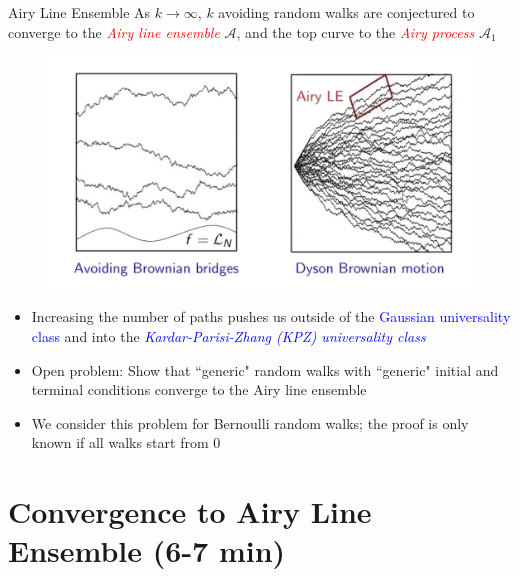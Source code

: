 \documentclass[9pt,t,dvipsnames]{beamer}
\begin{document}
\begin{frame}{Airy Line Ensemble}
As $k \to \infty$, $k$ avoiding random walks are conjectured to converge to the \textit{\textcolor{red}{Airy line ensemble}} $\mathcal{A}$, and the top curve to the \textit{\textcolor{red}{Airy process}} $\mathcal{A}_1$
\begin{figure}
	\includegraphics[height=0.45\textheight]{graphics/airy.png}
\end{figure}

\begin{itemize}
	
	\item Increasing the number of paths pushes us outside of the \textcolor{blue}{Gaussian universality class} and into the \textcolor{blue}{\textit{Kardar-Parisi-Zhang (KPZ) universality class}}
	
	\item Open problem: Show that ``generic" random walks with ``generic" initial and terminal conditions converge to the Airy line ensemble
	
	\item We consider this problem for Bernoulli random walks; the proof is only known if all walks start from 0
	
\end{itemize}
\end{frame}


\section{Convergence to Airy Line Ensemble (6-7 min)}
\end{document}
